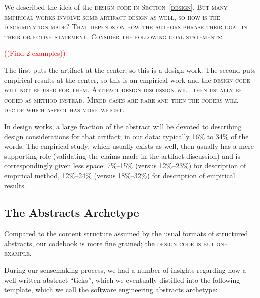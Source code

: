 \documentclass[10pt,journal,compsoc]{IEEEtran}
\newcommand{\Cb}[1]{\bgroup\scshape #1\egroup}  %
\newcommand{\Todo}[1]{\textcolor{red}{\sffamily ((#1))}}
\begin{document}
We described the idea of the \Cb{design} code in Section~\ref{design}.
But many empirical works involve some artifact design as well,
so how is the discrimination made?
That depends on how the authors phrase their goal in their
\Cb{objective} statement.
Consider the following goal statements:

\Todo{Find 2 examples}

The first puts the artifact at the center, so this is a design work.
The second puts empirical results at the center, so this is an empirical work
and the \Cb{design} code will not be used for them.
Artifact design discussion will then usually be coded as \Cb{method} instead.
Mixed cases are rare and then the coders will decide which aspect has more weight.

In design works, a large fraction of the abstract will be devoted to
describing design considerations for that artifact;
in our data: typically 16\% to 34\% of the words.
The empirical study, which usually exists as well, then usually has a mere
supporting role (validating the claims made in the artifact discussion)
and is correspondingly given less space:
7\%--15\% (versus 12\%--23\%) for description of empirical method,
12\%--24\% (versus 18\%--32\%) for description of empirical results.


\subsection{The Abstracts Archetype}\label{archetype}

Compared to the content structure assumed by the usual formats of
structured abstracts, our codebook is more fine grained;
the \Cb{design} code is but one example.

During our sensemaking process, we had a number of insights regarding
how a well-written abstract ``ticks'', which we eventually distilled into
the following template, which we call the software engineering abstracts archetype:
\end{document}

